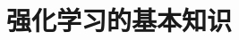 \setcounter{chapter}{9}

\hypertarget{ux5f3aux5316ux5b66ux4e60ux7684ux57faux672cux77e5ux8bc6}{%
\chapter{强化学习的基本知识}\label{ux5f3aux5316ux5b66ux4e60ux7684ux57faux672cux77e5ux8bc6}}
